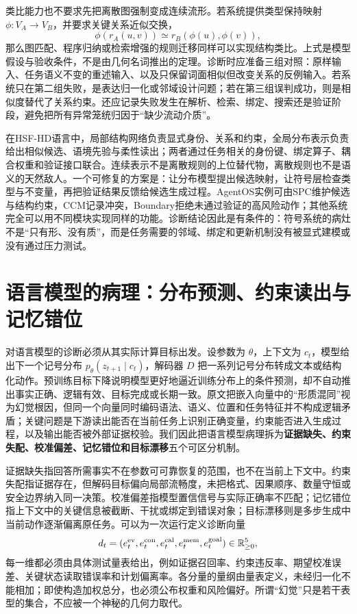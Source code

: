 类比能力也不要求先把离散图强制变成连续流形。若系统提供类型保持映射 \(\phi:V_A\rightarrow V_B\)，并要求关键关系近似交换，
\[
  \phi\!\left(r_A(u,v)\right)\simeq r_B\!\left(\phi(u),\phi(v)\right),
\]
那么图匹配、程序归纳或检索增强的规则迁移同样可以实现结构类比。上式是模型假设与验收条件，不是由几何名词推出的定理。诊断时应准备三组对照：原样输入、任务语义不变的重述输入、以及只保留词面相似但改变关系的反例输入。若系统只在第二组失败，是表达归一化或邻域设计问题；若在第三组误判成功，则是相似度替代了关系约束。还应记录失败发生在解析、检索、绑定、搜索还是验证阶段，避免把所有异常笼统归因于“缺少流动介质”。

在HSF-HD语言中，局部结构网络负责显式身份、关系和约束，全局分布表示负责给出相似候选、语境先验与柔性读出；两者通过任务相关的身份键、绑定算子、耦合权重和验证接口联合。连续表示不是离散规则的上位替代物，离散规则也不是语义的天然敌人。一个可修复的方案是：让分布模型提出候选映射，让符号层检查类型与不变量，再把验证结果反馈给候选生成过程。AgentOS实例可由SPC维护候选与结构约束，CCM记录冲突，Boundary拒绝未通过验证的高风险动作；其他系统完全可以用不同模块实现同样的功能。诊断结论因此是有条件的：符号系统的病灶不是“只有形、没有质”，而是任务需要的邻域、绑定和更新机制没有被显式建模或没有通过压力测试。

\section{语言模型的病理：分布预测、约束读出与记忆错位}
\label{sec:section_9222}

对语言模型的诊断必须从其实际计算目标出发。设参数为 \(\theta\)，上下文为 \(c_t\)，模型给出下一个记号分布 \(p_\theta(z_{t+1}\mid c_t)\)，解码器 \(D\) 把一系列记号分布转成文本或结构化动作。预训练目标下降说明模型更好地逼近训练分布上的条件预测，却不自动推出事实正确、逻辑有效、目标完成或长期一致。原文把嵌入向量中的“形质混同”视为幻觉根因，但同一个向量同时编码语法、语义、位置和任务特征并不构成逻辑矛盾；关键问题是下游读出能否在当前任务上识别正确变量，约束能否进入生成过程，以及输出能否被外部证据校验。我们因此把语言模型病理拆为\textbf{证据缺失、约束失配、校准偏差、记忆错位和目标漂移}五个可区分机制。

证据缺失指回答所需事实不在参数可可靠恢复的范围，也不在当前上下文中。约束失配指证据存在，但解码目标偏向局部流畅度，未把格式、因果顺序、数量守恒或安全边界纳入同一决策。校准偏差指模型置信信号与实际正确率不匹配；记忆错位指上下文中的关键信息被截断、干扰或绑定到错误对象；目标漂移则是多步生成中当前动作逐渐偏离原任务。可以为一次运行定义诊断向量
\[
  d_t=(e_t^{\rm ev},e_t^{\rm con},e_t^{\rm cal},
       e_t^{\rm mem},e_t^{\rm goal})\in\mathbb{R}_{\ge 0}^{5},
\]
每一维都必须由具体测试量表给出，例如证据召回率、约束违反率、期望校准误差、关键状态读取错误率和计划偏离率。各分量的量纲由量表定义，未经归一化不能相加；即使构造加权总分，也必须公布权重和风险偏好。所谓“幻觉”只是若干表型的集合，不应被一个神秘的几何力取代。


